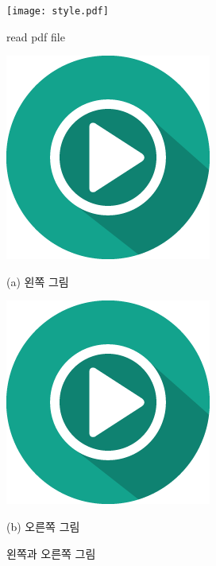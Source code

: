 \documentclass[11pt]{article}
\begin{document}
\begin{figure}[t]
\texttt{[image: style.pdf]}
\caption{read pdf file}
\end{figure}

\begin{figure}[!t]
\noindent
\begin{minipage}[t]{2.5in}
\centerline{\includegraphics[scale=0.5]{play.png}}
\centerline{(a) 왼쪽 그림}
\end{minipage}
\begin{minipage}[t]{2.5in}
\centerline{\includegraphics[scale=0.5]{play.png}}
\centerline{(b) 오른쪽 그림}
\end{minipage}
\caption{왼쪽과 오른쪽 그림 \label{fig:combi}}
\end{figure}

\end{document}
